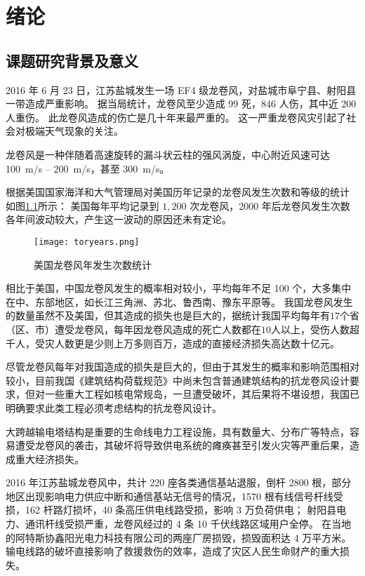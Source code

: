 \graphicspath{{figures/intro/}}

\chapter{绪论}

\section{课题研究背景及意义}
2016 年 6 月 23 日，江苏盐城发生一场 EF4 级龙卷风，对盐城市阜宁县、射阳县一带造成严重影响。
据当局统计，龙卷风至少造成 99 死，846 人伤，其中近 200 人重伤。
此龙卷风造成的伤亡是几十年来最严重的\cite{wiki2016yancheng}。
这一严重龙卷风灾引起了社会对极端天气现象的关注。

龙卷风是一种伴随着高速旋转的漏斗状云柱的强风涡旋，中心附近风速可达 \SI{100}{m/s} -- \SI{200}{m/s}，甚至 \SI{300}{m/s}。

根据美国国家海洋和大气管理局对美国历年记录的龙卷风发生次数和等级的统计
如图\ref{fig:tornado-years}所示\cite{noaa2017tornado}：
美国每年平均记录到 $1,200$ 次龙卷风，2000 年后龙卷风发生次数各年间波动较大，产生这一波动的原因还未有定论。
\begin{figure}[!htbp]
    \centering
    \texttt{[image: toryears.png]}
    \caption{美国龙卷风年发生次数统计}
    \label{fig:tornado-years}
\end{figure}

相比于美国，中国龙卷风发生的概率相对较小，平均每年不足 100 个，大多集中在中、东部地区，如长江三角洲、苏北、鲁西南、豫东平原等。
我国龙卷风发生的数量虽然不及美国，但其造成的损失也是巨大的，据统计我国平均每年有$17$个省（区、市）遭受龙卷风，每年因龙卷风造成的死亡人数都在$10$人以上，受伤人数超千人，受灾人数更是少则上万多则百万，造成的直接经济损失高达数十亿元\cite{liu2007chinese}。

尽管龙卷风每年对我国造成的损失是巨大的，但由于其发生的概率和影响范围相对较小，目前我国《建筑结构荷载规范》中尚未包含普通建筑结构的抗龙卷风设计要求，但对一些重大工程如核电常规岛，一旦遭受破坏，其后果将不堪设想，我国已明确要求此类工程必须考虑结构的抗龙卷风设计。

大跨越输电塔结构是重要的生命线电力工程设施，具有数量大、分布广等特点，容易遭受龙卷风的袭击，其破坏将导致供电系统的瘫痪甚至引发火灾等严重后果，造成重大经济损失。

2016 年江苏盐城龙卷风中，共计 220 座各类通信基站退服，倒杆 2800 根，部分地区出现影响电力供应中断和通信基站无信号的情况，1570 根有线信号杆线受损，162 杆路灯损坏，40 条高压供电线路受损，影响 3 万负荷供电；
射阳县电力、通讯杆线受损严重，龙卷风经过的 4 条 10 千伏线路区域用户全停。
在当地的阿特斯协鑫阳光电力科技有限公司的两座厂房损毁，损毁面积达 4 万平方米\cite{thepaper2016yancheng}。
输电线路的破坏直接影响了救援救伤的效率，造成了灾区人民生命财产的重大损失。

